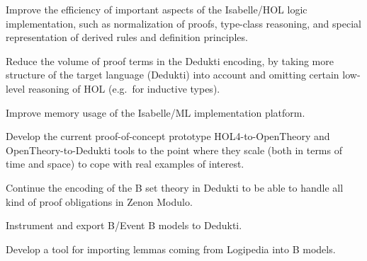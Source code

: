 \begin{workpackage}
\begin{tasklist}
\begin{task}[id=isabelle,
  title=Instrument Isabelle,
  shorttitle=Isabelle,
  lead=Tum,
  TumRM=5,
  wphases=1-12]
%
\vspace{-5mm}
\begin{compactitem}
\item Improve the efficiency of important aspects of the
  Isabelle/HOL logic implementation, such as normalization of proofs,
  type-class reasoning, and special representation of derived rules
  and definition principles.
\item Reduce the volume of proof terms in the Dedukti encoding, by
taking more structure of the target language (Dedukti) into account
and omitting certain low-level reasoning of HOL (e.g.\ for inductive
types).
\item Improve memory usage of the Isabelle/ML implementation platform.
\end{compactitem}
\end{task}

\begin{task}[id=HOL4,
  title=Instrument HOL4,
  shorttitle=HOL4,
  lead=Cha,
  ChaRM=16,
  wphases=1-14]
%
\vspace{-5mm}
\begin{compactitem}
\item Develop the current proof-of-concept prototype
    HOL4-to-OpenTheory and OpenTheory-to-Dedukti tools to the point
    where they scale (both in terms of time and space) to cope with
    real examples of interest.
\end{compactitem}
\end{task}

\begin{task}[id=atelier-b,
  title=Instrument Atelier-B/Rodin,
  shorttitle=Atelier-B,
  lead=Imt,
  CleRM=14,
  ImtRM=1,
  TouRM=11,
  wphases=1-48]
%
\vspace{-5mm}
\begin{compactitem}
\item Continue the encoding of the B set theory in Dedukti to be
  able to handle all kind of proof obligations in Zenon Modulo.
\item Instrument and export B/Event B models to Dedukti.
\item Develop a tool for importing lemmas coming from Logipedia
into B models.
\end{compactitem}
\end{task}


\end{tasklist}
\end{workpackage}
